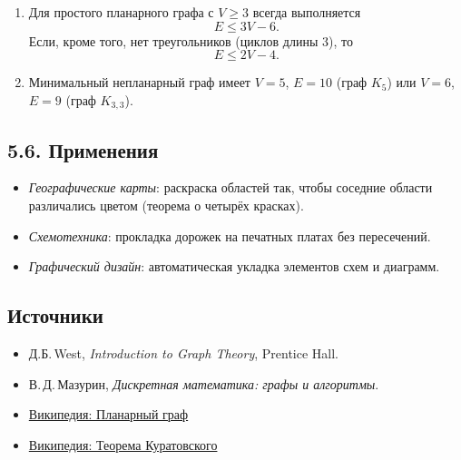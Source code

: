 \documentclass{article}
\begin{document}
\begin{enumerate}[label=\arabic*)]
  \item Для простого планарного графа с $V\ge3$ всегда выполняется
  \[
    E \le 3V - 6.
  \]
  Если, кроме того, нет треугольников (циклов длины 3), то
  \[
    E \le 2V - 4.
  \]
  \item Минимальный непланарный граф имеет $V=5$, $E=10$ (граф $K_5$) или $V=6$, $E=9$ (граф $K_{3,3}$).
\end{enumerate}

\subsection*{5.6. Применения}

\begin{itemize}[leftmargin=*]
  \item \emph{Географические карты}: раскраска областей так, чтобы соседние области различались цветом (теорема о четырёх красках).
  \item \emph{Схемотехника}: прокладка дорожек на печатных платах без пересечений.
  \item \emph{Графический дизайн}: автоматическая укладка элементов схем и диаграмм.
\end{itemize}

\subsection*{Источники}

\begin{itemize}
  \item Д.Б.\,West, \emph{Introduction to Graph Theory}, Prentice Hall.
  \item В.\,Д.\,Мазурин, \emph{Дискретная математика: графы и алгоритмы}.
  \item \href{https://ru.wikipedia.org/wiki/Планарный_граф}{Википедия: Планарный граф}
  \item \href{https://ru.wikipedia.org/wiki/Теорема_Куратовского}{Википедия: Теорема Куратовского}
\end{itemize}
\end{document}
